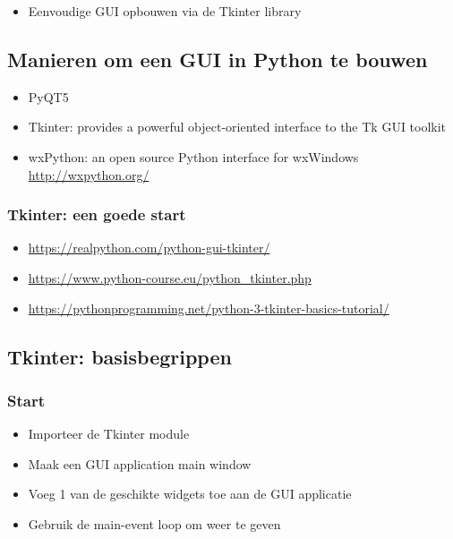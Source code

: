 \documentclass{article}
\begin{document}
\begin{itemize}
    \item Eenvoudige GUI opbouwen via de Tkinter library
\end{itemize}

\subsection{Manieren om een GUI in Python te bouwen}

\begin{itemize}
    \item PyQT5
    \item Tkinter: provides a powerful object-oriented interface to the Tk GUI toolkit
    \item wxPython: an open source Python interface for wxWindows \url{http://wxpython.org/}
\end{itemize}

\subsubsection{Tkinter: een goede start}

\begin{itemize}
    \item \url{https://realpython.com/python-gui-tkinter/}
    \item \url{https://www.python-course.eu/python_tkinter.php}
    \item \url{https://pythonprogramming.net/python-3-tkinter-basics-tutorial/}
\end{itemize}

\subsection{Tkinter: basisbegrippen}

\subsubsection{Start}

\begin{itemize}
    \item Importeer de Tkinter module
    \item Maak een GUI application main window
    \item Voeg 1 van de geschikte widgets toe aan de GUI applicatie
    \item Gebruik de main-event loop om weer te geven
\end{itemize}
\end{document}
